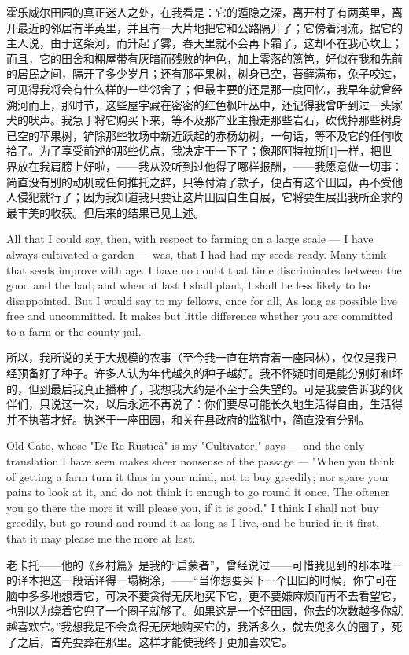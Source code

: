 {霍乐威尔田园的真正迷人之处，在我看是：它的遁隐之深，离开村子有两英里，离开最近的邻居有半英里，并且有一大片地把它和公路隔开了；它傍着河流，据它的主人说，由于这条河，而升起了雾，春天里就不会再下霜了，这却不在我心坎上；而且，它的田舍和棚屋带有灰暗而残败的神色，加上零落的篱笆，好似在我和先前的居民之间，隔开了多少岁月；还有那苹果树，树身已空，苔藓满布，兔子咬过，可见得我将会有什么样的一些邻舍了；但最主要的还是那一度回忆，我早年就曾经溯河而上，那时节，这些屋宇藏在密密的红色枫叶丛中，还记得我曾听到过一头家犬的吠声。我急于将它购买下来，等不及那产业主搬走那些岩石，砍伐掉那些树身已空的苹果树，铲除那些牧场中新近跃起的赤杨幼树，一句话，等不及它的任何收拾了。为了享受前述的那些优点，我决定干一下了；像那阿特拉斯[1]一样，把世界放在我肩膀上好啦，——我从没听到过他得了哪样报酬，——我愿意做一切事：简直没有别的动机或任何推托之辞，只等付清了款子，便占有这个田园，再不受他人侵犯就行了；因为我知道我只要让这片田园自生自展，它将要生展出我所企求的最丰美的收获。但后来的结果已见上述。


All that I could say, then, with respect to farming on a large scale — I have always cultivated a garden — was, that I had had my seeds ready. Many think that seeds improve with age. I have no doubt that time discriminates between the good and the bad; and when at last I shall plant, I shall be less likely to be disappointed. But I would say to my fellows, once for all, As long as possible live free and uncommitted. It makes but little difference whether you are committed to a farm or the county jail.

所以，我所说的关于大规模的农事（至今我一直在培育着一座园林），仅仅是我已经预备好了种子。许多人认为年代越久的种子越好。我不怀疑时间是能分别好和坏的，但到最后我真正播种了，我想我大约是不至于会失望的。可是我要告诉我的伙伴们，只说这一次，以后永远不再说了：你们要尽可能长久地生活得自由，生活得并不执著才好。执迷于一座田园，和关在县政府的监狱中，简直没有分别。


Old Cato, whose "De Re Rusticâ" is my "Cultivator," says — and the only translation I have seen makes sheer nonsense of the passage — "When you think of getting a farm turn it thus in your mind, not to buy greedily; nor spare your pains to look at it, and do not think it enough to go round it once. The oftener you go there the more it will please you, if it is good." I think I shall not buy greedily, but go round and round it as long as I live, and be buried in it first, that it may please me the more at last.

老卡托——他的《乡村篇》是我的“启蒙者”，曾经说过——可惜我见到的那本唯一的译本把这一段话译得一塌糊涂，——“当你想要买下一个田园的时候，你宁可在脑中多多地想着它，可决不要贪得无厌地买下它，更不要嫌麻烦而再不去看望它，也别以为绕着它兜了一个圈子就够了。如果这是一个好田园，你去的次数越多你就越喜欢它。”我想我是不会贪得无厌地购买它的，我活多久，就去兜多久的圈子，死了之后，首先要葬在那里。这样才能使我终于更加喜欢它。


}
